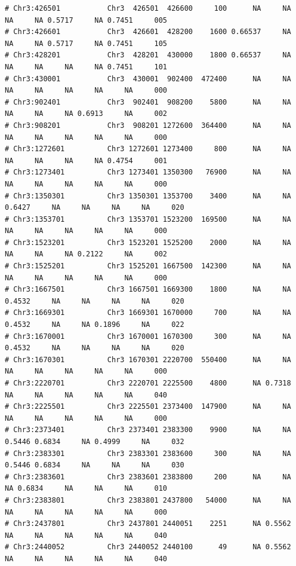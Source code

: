 \documentclass{article}\usepackage[]{graphicx}\usepackage[]{color}
\makeatletter
\newenvironment{kframe}{%
 \def\at@end@of@kframe{}%
 \ifinner\ifhmode%
  \def\at@end@of@kframe{\end{minipage}}%
  \begin{minipage}{\columnwidth}%
 \fi\fi%
 \def\FrameCommand##1{\hskip\@totalleftmargin \hskip-\fboxsep
 \colorbox{shadecolor}{##1}\hskip-\fboxsep
     \hskip-\linewidth \hskip-\@totalleftmargin \hskip\columnwidth}%
 \MakeFramed {\advance\hsize-\width
   \@totalleftmargin\z@ \linewidth\hsize
   \@setminipage}}%
 {\par\unskip\endMakeFramed%
 \at@end@of@kframe}
\newenvironment{knitrout}{}{} %
\makeatother
\begin{document}
\begin{knitrout}
\begin{kframe}
\begin{verbatim}
# Chr3:426501           Chr3  426501  426600     100      NA     NA     NA     NA 0.5717     NA 0.7451     005
# Chr3:426601           Chr3  426601  428200    1600 0.66537     NA     NA     NA 0.5717     NA 0.7451     105
# Chr3:428201           Chr3  428201  430000    1800 0.66537     NA     NA     NA     NA     NA 0.7451     101
# Chr3:430001           Chr3  430001  902400  472400      NA     NA     NA     NA     NA     NA     NA     000
# Chr3:902401           Chr3  902401  908200    5800      NA     NA     NA     NA     NA 0.6913     NA     002
# Chr3:908201           Chr3  908201 1272600  364400      NA     NA     NA     NA     NA     NA     NA     000
# Chr3:1272601          Chr3 1272601 1273400     800      NA     NA     NA     NA     NA     NA 0.4754     001
# Chr3:1273401          Chr3 1273401 1350300   76900      NA     NA     NA     NA     NA     NA     NA     000
# Chr3:1350301          Chr3 1350301 1353700    3400      NA     NA 0.6427     NA     NA     NA     NA     020
# Chr3:1353701          Chr3 1353701 1523200  169500      NA     NA     NA     NA     NA     NA     NA     000
# Chr3:1523201          Chr3 1523201 1525200    2000      NA     NA     NA     NA     NA 0.2122     NA     002
# Chr3:1525201          Chr3 1525201 1667500  142300      NA     NA     NA     NA     NA     NA     NA     000
# Chr3:1667501          Chr3 1667501 1669300    1800      NA     NA 0.4532     NA     NA     NA     NA     020
# Chr3:1669301          Chr3 1669301 1670000     700      NA     NA 0.4532     NA     NA 0.1896     NA     022
# Chr3:1670001          Chr3 1670001 1670300     300      NA     NA 0.4532     NA     NA     NA     NA     020
# Chr3:1670301          Chr3 1670301 2220700  550400      NA     NA     NA     NA     NA     NA     NA     000
# Chr3:2220701          Chr3 2220701 2225500    4800      NA 0.7318     NA     NA     NA     NA     NA     040
# Chr3:2225501          Chr3 2225501 2373400  147900      NA     NA     NA     NA     NA     NA     NA     000
# Chr3:2373401          Chr3 2373401 2383300    9900      NA     NA 0.5446 0.6834     NA 0.4999     NA     032
# Chr3:2383301          Chr3 2383301 2383600     300      NA     NA 0.5446 0.6834     NA     NA     NA     030
# Chr3:2383601          Chr3 2383601 2383800     200      NA     NA     NA 0.6834     NA     NA     NA     010
# Chr3:2383801          Chr3 2383801 2437800   54000      NA     NA     NA     NA     NA     NA     NA     000
# Chr3:2437801          Chr3 2437801 2440051    2251      NA 0.5562     NA     NA     NA     NA     NA     040
# Chr3:2440052          Chr3 2440052 2440100      49      NA 0.5562     NA     NA     NA     NA     NA     040

\end{verbatim}
\end{kframe}
\end{knitrout}
\end{document}
